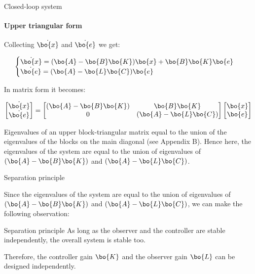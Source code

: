 \documentclass{beamer}
\begin{document}
\begin{frame}{Closed-loop system}
\framesubtitle{Upper triangular form}
\begin{flushleft}

Collecting $\dot {\bo{x}}$ and $\dot{\bo{e}}$ we get:

\begin{equation}
\begin{cases}
\dot {\bo{x}} = (\bo{A}-\bo{B}\bo{K}) \bo{x} +  \bo{B}\bo{K}\bo{e} \\
\dot{\bo{e}} = 
(\bo{A}  - \bo{L}\bo{C})\bo{e}
\end{cases}
\end{equation}

In matrix form it becomes:

\begin{equation}
\begin{bmatrix}
\dot {\bo{x}} \\
\dot{\bo{e}}
\end{bmatrix}
=
\begin{bmatrix}
(\bo{A}-\bo{B}\bo{K}) & \bo{B}\bo{K} \\
0 & (\bo{A}  - \bo{L}\bo{C})
\end{bmatrix}
\begin{bmatrix}
\bo{x} \\
\bo{e}
\end{bmatrix}
\end{equation}

Eigenvalues of an upper block-triangular matrix equal to the union of the eigenvalues of the blocks on the main diagonal (see Appendix B). Hence here, the eigenvalues of the system are equal to the union of eigenvalues of $(\bo{A}-\bo{B}\bo{K})$ and $(\bo{A}  - \bo{L}\bo{C})$. 

\end{flushleft}
\end{frame}



\begin{frame}{Separation principle}
\begin{flushleft}
 
Since the eigenvalues of the system are equal to the union of eigenvalues of $(\bo{A}-\bo{B}\bo{K})$ and $(\bo{A}  - \bo{L}\bo{C})$, we can make the following observation:

\bigskip

\begin{alertblock}{Separation principle}
As long as the observer and the controller are stable independently, the overall system is stable too.
\end{alertblock}

\bigskip

Therefore, the controller gain $\bo{K}$ and the observer gain $\bo{L}$  can be designed independently.

\end{flushleft}
\end{frame}
\end{document}
